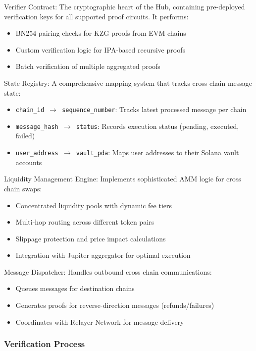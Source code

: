 \documentclass[11pt,a4paper]{article}
\begin{document}
Verifier Contract: The cryptographic heart of the Hub, containing pre-deployed verification keys for all supported proof circuits. It performs:
\begin{itemize}
    \item BN254 pairing checks for KZG proofs from EVM chains
    \item Custom verification logic for IPA-based recursive proofs
    \item Batch verification of multiple aggregated proofs
\end{itemize}

State Registry: A comprehensive mapping system that tracks cross chain message state:
\begin{itemize}
    \item \texttt{chain\_id $\rightarrow$ sequence\_number}: Tracks latest processed message per chain
    \item \texttt{message\_hash $\rightarrow$ status}: Records execution status (pending, executed, failed)
    \item \texttt{user\_address $\rightarrow$ vault\_pda}: Maps user addresses to their Solana vault accounts
\end{itemize}

Liquidity Management Engine: Implements sophisticated AMM logic for cross chain swaps:
\begin{itemize}
    \item Concentrated liquidity pools with dynamic fee tiers
    \item Multi-hop routing across different token pairs
    \item Slippage protection and price impact calculations
    \item Integration with Jupiter aggregator for optimal execution
\end{itemize}

Message Dispatcher: Handles outbound cross chain communications:
\begin{itemize}
    \item Queues messages for destination chains
    \item Generates proofs for reverse-direction messages (refunds/failures)
    \item Coordinates with Relayer Network for message delivery
\end{itemize}

\subsubsection*{Verification Process}
\end{document}
